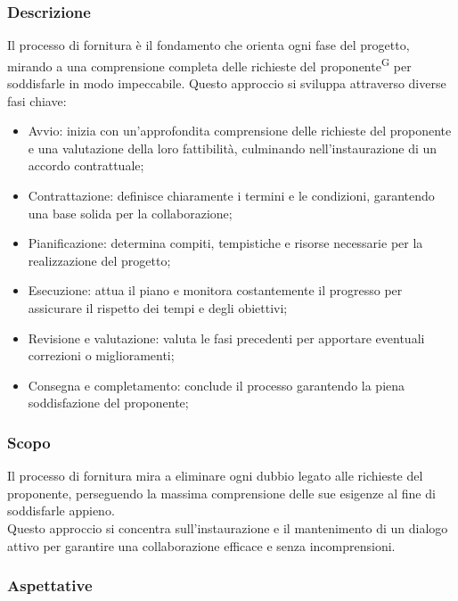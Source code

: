 \documentclass[5pt]{article}
\begin{document}
\subsubsection{Descrizione}

Il processo di fornitura è il fondamento che orienta ogni fase del progetto, mirando a una comprensione completa delle richieste del proponente\textsuperscript{G} per soddisfarle in modo impeccabile. Questo approccio si sviluppa attraverso diverse fasi chiave:
\begin{itemize}
    \item{Avvio:} inizia con un'approfondita comprensione delle richieste del proponente e una valutazione della loro fattibilità, culminando nell'instaurazione di un accordo contrattuale;
    \item{Contrattazione:} definisce chiaramente i termini e le condizioni, garantendo una base solida per la collaborazione;
    \item{Pianificazione:} determina compiti, tempistiche e risorse necessarie per la realizzazione del progetto;
    \item{Esecuzione:} attua il piano e monitora costantemente il progresso per assicurare il rispetto dei tempi e degli obiettivi;
    \item{Revisione e valutazione:} valuta le fasi precedenti per apportare eventuali correzioni o miglioramenti;
    \item{Consegna e completamento:} conclude il processo garantendo la piena soddisfazione del proponente;
\end{itemize}

\subsubsection{Scopo}

Il processo di fornitura mira a eliminare ogni dubbio legato alle richieste del proponente, perseguendo la massima comprensione delle sue esigenze al fine di soddisfarle appieno.\\
Questo approccio si concentra sull'instaurazione e il mantenimento di un dialogo attivo per garantire una collaborazione efficace e senza incomprensioni.

\subsubsection{Aspettative }
\end{document}
